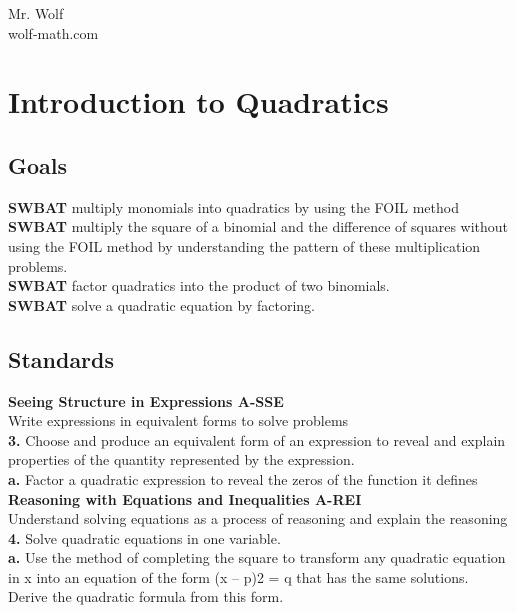 \documentclass[11pt]{article}
\begin{document}
Mr. Wolf\\ wolf-math.com

\section*{Introduction to Quadratics}



\subsection*{Goals}

\textbf{SWBAT} multiply monomials into quadratics by using the FOIL method\\

\textbf{SWBAT} multiply the square of a binomial and the difference of squares without using the FOIL method by understanding the pattern of these multiplication problems.\\

\textbf{SWBAT} factor quadratics into the product of two binomials.\\

\textbf{SWBAT} solve a quadratic equation by factoring.\\



\subsection*{Standards}

\textbf{Seeing Structure in Expressions \hfill A-SSE}\\

Write expressions in equivalent forms to solve problems\\

\textbf{3.} Choose and produce an equivalent form of an expression to reveal and explain properties of the quantity represented by the expression.\\
\textbf{a.} Factor a quadratic expression to reveal the zeros of the function it defines\\

\textbf{Reasoning with Equations and Inequalities \hfill A-REI}\\

Understand solving equations as a process of reasoning and explain the reasoning\\

\textbf{4.} Solve quadratic equations in one variable.\\
\textbf{a.} Use the method of completing the square to transform any
quadratic equation in x into an equation of the form (x – p)2 = q
that has the same solutions. Derive the quadratic formula from
this form.\\
\end{document}

